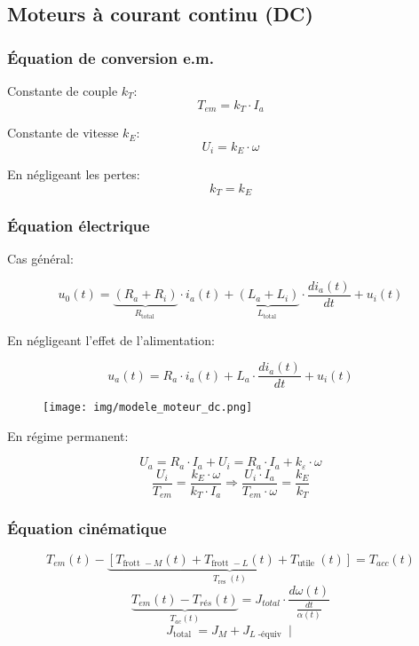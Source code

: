 \documentclass[10pt]{article} %
\begin{document}
\begin{multicols}{3}
\begin{flushleft}
		\subsection*{Moteurs à courant continu (DC)}
		
			\subsubsection*{Équation de conversion e.m.}
			
				Constante de couple $k_T$:
				\[T_{e m}=k_{T} \cdot I_{a}\]
				
				Constante de vitesse $k_E$:
				\[U_{i}=k_{E} \cdot \omega\]
				
				En négligeant les pertes:
				\[k_{T}=k_{E}\]
			
			\subsubsection*{Équation électrique}
			
				Cas général:
			
				\[u_{0}(t)=\underbrace{\left(R_{a}+R_{i}\right)}_{R_{\text {total }}} \cdot i_{a}(t)+\underbrace{\left(L_{a}+L_{i}\right)}_{L_{\text {total }}} \cdot \frac{d i_{a}(t)}{d t}+u_{i}(t)\]
				
				En négligeant l'effet de l'alimentation:
				
				\[u_{a}(t)=R_{a} \cdot i_{a}(t)+L_{a} \cdot \frac{d i_{a}(t)}{d t}+u_{i}(t)\]
				
				\begin{figure}[H]
					\texttt{[image: img/modele\_moteur\_dc.png]}
					\centering
				\end{figure}
				
				En régime permanent:
				
				\[U_{a}=R_{a} \cdot I_{a}+U_{i}=R_{a} \cdot I_{a}+k_{\varepsilon} \cdot \omega\]
				\[\frac{U_{i}}{T_{e m}}=\frac{k_{E} \cdot \omega}{k_{T} \cdot I_{a}} \Rightarrow \frac{U_{i} \cdot I_{a}}{T_{e m} \cdot \omega}=\frac{k_{E}}{k_{T}}\]
				
			\subsubsection*{Équation cinématique}
				
				\[T_{e m}(t)-\underbrace{\left[T_{\text {frott }-M}(t)+T_{\text {frott }-L}(t)+T_{\text {utile }}(t)\right]}_{T_{\text {res }}(t)}=T_{a c c}(t)\]
				\[\underbrace{T_{e m}(t)-T_{r é s}(t)}_{T_{a c}(t)}=J_{t o t a l} \cdot \frac{d \omega(t)}{\frac{d t}{\alpha(t)}}\]
				\[J_{\text {total }}=J_{M}+J_{L \text { -équiv }} \mid\]
				

\end{flushleft}
\end{multicols}
\end{document}
